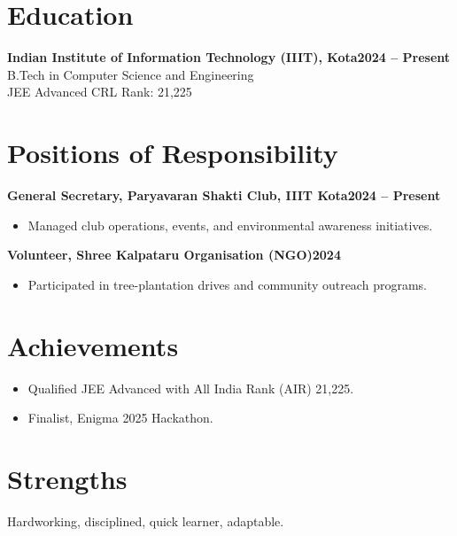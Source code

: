 \documentclass[10pt,a4paper]{article}
\newcommand{\role}[2]{%
  \textbf{#1}\hfill\textbf{\small #2}\\[-2pt]
}
\begin{document}
\section{Education}
{\small
\role{Indian Institute of Information Technology (IIIT), Kota}{2024 -- Present}
B.Tech in Computer Science and Engineering\\[-1pt]
JEE Advanced CRL Rank: 21,225
}

\section{Positions of Responsibility}
{\small
\role{General Secretary, Paryavaran Shakti Club, IIIT Kota}{2024 -- Present}
\begin{itemize}
  \item Managed club operations, events, and environmental awareness initiatives.
\end{itemize}
\vspace{1pt}
\role{Volunteer, Shree Kalpataru Organisation (NGO)}{2024}
\begin{itemize}
  \item Participated in tree-plantation drives and community outreach programs.
\end{itemize}
}

\section{Achievements}
{\small
\begin{itemize}
  \item Qualified JEE Advanced with All India Rank (AIR) 21,225.
  \item Finalist, Enigma 2025 Hackathon.
\end{itemize}
}

\section{Strengths}
{\small Hardworking, disciplined, quick learner, adaptable.}
\end{document}
